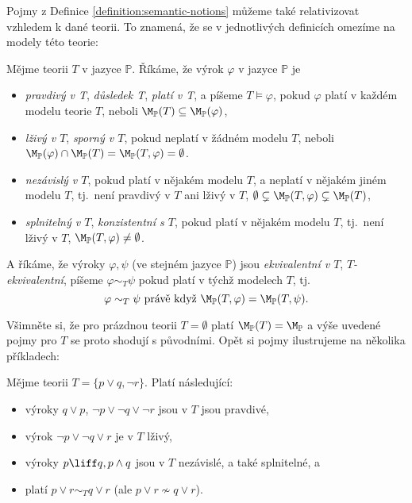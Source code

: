 Pojmy z Definice \ref{definition:semantic-notions} můžeme také relativizovat vzhledem k dané teorii. To znamená, že se v jednotlivých definicích omezíme na modely této teorie:

\begin{definition}
    Mějme teorii $T$ v jazyce $\mathbb P$. Říkáme, že výrok $\varphi$ v jazyce $\mathbb P$ je
    \begin{itemize}
        \item \emph{pravdivý v T}, \emph{důsledek T}, \emph{platí v T}, a píšeme $T \models \varphi$, pokud $\varphi$ platí v každém modelu teorie $T$, neboli $\M_\mathbb P(T)\subseteq \M_\mathbb P(\varphi)$,
        \item \emph{lživý v $T$}, \emph{sporný v $T$}, pokud neplatí v žádném modelu $T$, neboli $\M_\mathbb P(\varphi)\cap\M_\mathbb P(T)=\M_\mathbb P(T,\varphi)=\emptyset$.
        \item \emph{nezávislý v $T$}, pokud platí v nějakém modelu $T$, a neplatí v nějakém jiném modelu $T$, tj.\ není pravdivý v $T$ ani lživý v $T$, $\emptyset\subsetneq\M_\mathbb P(T,\varphi)\subsetneq\M_\mathbb P(T)$,
        \item \emph{splnitelný v $T$}, \emph{konzistentní s $T$}, pokud platí v nějakém modelu $T$, tj.\ není lživý v $T$, $\M_\mathbb P(T,\varphi)\neq\emptyset$.
    \end{itemize}
    A říkáme, že výroky $\varphi,\psi$ (ve stejném jazyce $\mathbb P$) jsou \emph{ekvivalentní v $T$}, \emph{$T$-ekvivalentní}, píšeme $\varphi\sim_T\psi$ pokud platí v týchž modelech $T$, tj.\
    $$
    \varphi\sim_T\psi\text{ právě když }\M_\mathbb P(T,\varphi)=\M_\mathbb P(T,\psi).
    $$
    \end{definition}

Všimněte si, že pro prázdnou teorii $T=\emptyset$ platí $\M_\mathbb P(T)=\M_\mathbb P$ a výše uvedené pojmy pro $T$ se proto shodují s původními. Opět si pojmy ilustrujeme na několika příkladech:

\begin{example} Mějme teorii $T=\{p\lor q,\neg r\}$. Platí následující:
    \begin{itemize}
        \item výroky $q\lor p$, $\neg p\lor\neg q\lor \neg r$ jsou v $T$ jsou pravdivé,
        \item výrok $\neg p\lor\neg q\lor r$ je v $T$ lživý,
        \item výroky $p\liff q, p\land q$ jsou v $T$ nezávislé, a také splnitelné, a
        \item platí $p\lor r\sim_T q\lor r$ (ale $p\lor r\not\sim q\lor r$).
    \end{itemize}      
\end{example}


